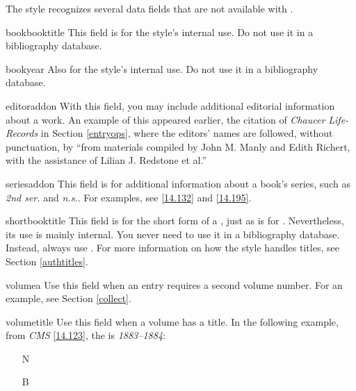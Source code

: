 \documentclass[11pt,letterpaper,oneside]{article}
\begin{document}
The style recognizes several data fields that are not available with
\biblatex.

\begin{marglist}

\item[bookbooktitle] This field is for the style's internal use. Do
not use it in a bibliography database.

\item[bookyear] Also for the style's internal use. Do not use it in a
bibliography database.

\item[editoraddon] With this field, you may include additional
editorial information about a work. An example of this appeared
earlier, the citation of \textit{Chaucer Life-Records} in Section
\ref{entryops}, where the editors' names are followed, without
punctuation, by ``from materials compiled by John M. Manly and Edith
Richert, with the assistance of Lilian J. Redstone et al.''

\item[seriesaddon] This field is for additional information about a
book's series, such as \textit{2nd ser.} and \textit{n.s.}. For
examples, see \ref{14.132} and \ref{14.195}.

\item[shortbooktitle] This field is for the short form of a
, just as  is for
. Nevertheless, its use is mainly internal. You never
need to use it in a bibliography database. Instead, always use
. For more information on how the style handles
titles, see Section \ref{authtitles}.

\item[volumea] Use this field when an entry requires a second volume
number. For an example, see Section \ref{collect}.

\item[volumetitle] Use this field when a volume has a title. In the
following example, from \textit{CMS} \ref{14.123}, the
 is \textit{1883--1884}:

\begin{itemize}
\item[N] 

\item[B] 
\end{itemize}

\end{marglist}
\end{document}
